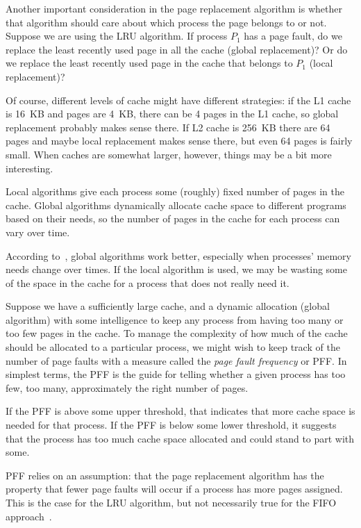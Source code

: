 Another important consideration in the page replacement algorithm is whether that algorithm should care about which process the page belongs to or not. Suppose we are using the LRU algorithm. If process $P_{1}$ has a page fault, do we replace the least recently used page in all the cache (global replacement)? Or do we replace the least recently used page in the cache that belongs to $P_{1}$ (local replacement)?

Of course, different levels of cache might have different strategies: if the L1 cache is 16~KB and pages are 4~KB, there can be 4 pages in the L1 cache, so global replacement probably makes sense there. If L2 cache is 256~KB there are 64 pages and maybe local replacement makes sense there, but even 64 pages is fairly small. When caches are somewhat larger, however, things may be a bit more interesting.

Local algorithms give each process some (roughly) fixed number of pages in the cache. Global algorithms dynamically allocate cache space to different programs based on their needs, so the number of pages in the cache for each process can vary over time. 

According to~\cite{mos}, global algorithms work better, especially when processes' memory needs change over times. If the local algorithm is used, we may be wasting some of the space in the cache for a process that does not really need it. 

Suppose we have a sufficiently large cache, and a dynamic allocation (global algorithm) with some intelligence to keep any process from having too many or too few pages in the cache. To manage the complexity of how much of the cache should be allocated to a particular process, we might wish to keep track of the number of page faults with a measure called the \textit{page fault frequency} or PFF. In simplest terms, the PFF is the guide for telling whether a given process has too few, too many, approximately the right number of pages. 

If the PFF is above some upper threshold, that indicates that more cache space is needed for that process. If the PFF is below some lower threshold, it suggests that the process has too much cache space allocated and could stand to part with some.

PFF relies on an assumption: that the page replacement algorithm has the property that fewer page faults will occur if a process has more pages assigned. This is the case for the LRU algorithm, but not necessarily true for the FIFO approach~\cite{mte241}.





